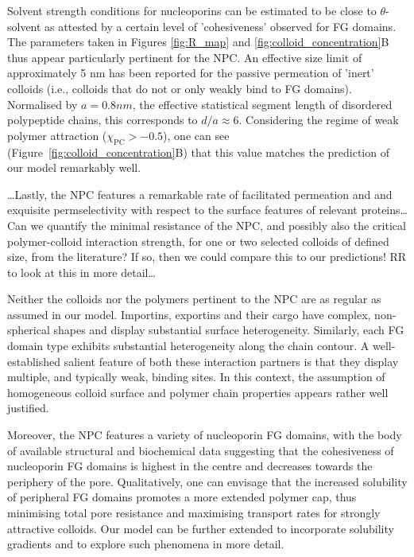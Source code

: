 \documentclass[12pt, a4paper]{article}
\begin{document}
Solvent strength conditions for nucleoporins can be estimated to be close to $\theta$-solvent as attested by a certain level of 'cohesiveness' observed for FG domains. 
The parameters taken in Figures \ref{fig:R_map} and \ref{fig:colloid_concentration}B thus appear particularly pertinent for the NPC.
An effective size limit of approximately 5 nm has been reported for the passive permeation of 'inert' colloids (i.e., colloids that do not or only weakly bind to FG domains).
Normalised by $a = 0.8 nm$, the effective statistical segment length of disordered polypeptide chains, this corresponds to $d/a\approx 6$. Considering the regime of weak polymer attraction ($\chi_{\text{PC}} > -0.5$), one can see (Figure~\ref{fig:colloid_concentration}B) that this value matches the prediction of our model remarkably well.

\dots Lastly, the NPC features a remarkable rate of facilitated permeation and and exquisite permselectivity with respect to the surface features of relevant proteins\dots
Can we quantify the minimal resistance of the NPC, and possibly also the critical polymer-colloid interaction strength, for one or two selected colloids of defined size, from the literature? If so, then we could compare this to our predictions! RR to look at this in more detail\dots

Neither the colloids nor the polymers pertinent to the NPC are as regular as assumed in our model.
Importins, exportins and their cargo have complex, non-spherical shapes and display substantial surface heterogeneity.
Similarly, each FG domain type exhibits substantial heterogeneity along the chain contour.
A well-established salient feature of both these interaction partners is that they display multiple, and typically weak, binding sites. In this context, the assumption of homogeneous colloid surface and polymer chain properties appears rather well justified. 

Moreover, the NPC features a variety of nucleoporin FG domains, with the body of available structural and biochemical data suggesting that the cohesiveness of nucleoporin FG domains is highest in the centre and decreases towards the periphery of the pore.
Qualitatively, one can envisage that the increased solubility of peripheral FG domains promotes a more extended polymer cap, thus minimising total pore resistance and maximising transport rates for strongly attractive colloids.
Our model can be further extended to incorporate  solubility gradients and to explore such phenomena in more detail.
\end{document}
